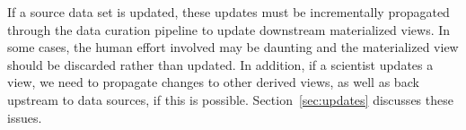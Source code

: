 





\stitle{[Updates.]}  
If a source data set is updated, these updates must be incrementally propagated through the data curation pipeline to update downstream materialized views. 
In some cases, the human effort involved may be daunting and the materialized view should be discarded rather than updated. 
In addition, if a scientist updates a view, we need to propagate changes to other derived views, as well as back upstream to data sources, if this is possible. Section~\ref{sec:updates} discusses these  issues.




